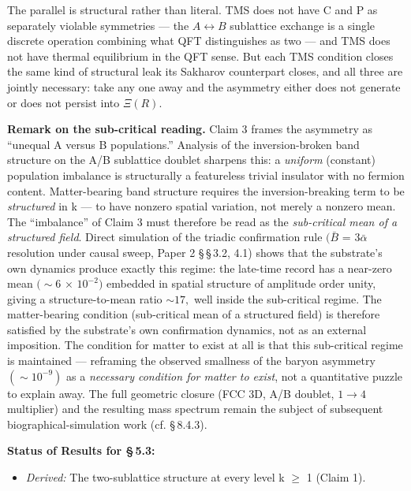 \documentclass[11pt,oneside]{report}
\theoremstyle{definition}
\theoremstyle{remark}
\begin{document}
The parallel is structural rather than literal. TMS does not have C and
P as separately violable symmetries --- the \ensuremath{A\leftrightarrow B} sublattice exchange is a
single discrete operation combining what QFT distinguishes as two ---
and TMS does not have thermal equilibrium in the QFT sense. But each TMS
condition closes the same kind of structural leak its Sakharov
counterpart closes, and all three are jointly necessary: take any one
away and the asymmetry either does not generate or does not persist into
\ensuremath{\Xi (R).}

\textbf{Remark on the sub-critical reading.} Claim 3 frames the
asymmetry as ``unequal A versus B populations.'' Analysis of the
inversion-broken band structure on the A/B sublattice doublet sharpens
this: a \emph{uniform} (constant) population imbalance is structurally a
featureless trivial insulator with no fermion content. Matter-bearing
band structure requires the inversion-breaking term to be
\emph{structured} in k --- to have nonzero spatial variation, not merely
a nonzero mean. The ``imbalance'' of Claim 3 must therefore be read as
the \emph{sub-critical mean of a structured field}. Direct simulation of
the triadic confirmation rule \ensuremath{(\bar{B}} = \ensuremath{3\bar{\alpha}} resolution under causal sweep,
Paper 2 \S\,\S\,3.2, 4.1) shows that the substrate's own dynamics produce
exactly this regime: the late-time record has a near-zero mean \ensuremath{(\sim 6} \ensuremath{\times}
\ensuremath{10^{-2})} embedded in spatial structure of amplitude order unity, giving a
structure-to-mean ratio \ensuremath{\sim 17,} well inside the sub-critical regime. The
matter-bearing condition (sub-critical mean of a structured field) is
therefore satisfied by the substrate's own confirmation dynamics, not as
an external imposition. The condition for matter to exist at all is that
this sub-critical regime is maintained --- reframing the observed
smallness of the baryon asymmetry \ensuremath{(\sim 10^{-9})} as a \emph{necessary condition
for matter to exist}, not a quantitative puzzle to explain away. The
full geometric closure (FCC 3D, A/B doublet, \ensuremath{1\to 4} multiplier) and the
resulting mass spectrum remain the subject of subsequent
biographical-simulation work (cf. \S\,8.4.3).

\textbf{Status of Results for \S\,5.3:}

\begin{itemize}
\item
  \emph{Derived:} The two-sublattice structure at every level k \ensuremath{\geq} 1
  (Claim 1).
\end{itemize}
\end{document}
